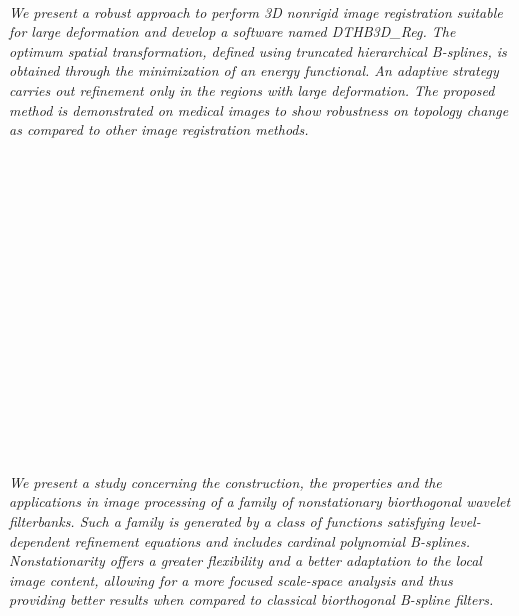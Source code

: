 \begin{multicols}{2}
\\
      \textit{We present a robust approach to perform 3D nonrigid image registration suitable for large deformation and develop a software named DTHB3D\_Reg. The optimum spatial transformation, defined using truncated hierarchical B-splines, is obtained through the minimization of an energy functional. An adaptive strategy carries out refinement only in the regions with large deformation. The proposed method is demonstrated on medical images to show robustness on topology change as compared to other image registration methods.}\\
\\ 
        \\
        \\\\
        \\
        \\\\
        \\
        \\\\
        \\
        \\\\
        \\
        \\\\
\\
      \textit{We present a study concerning the construction, the properties and the applications in image processing of a family of nonstationary biorthogonal wavelet filterbanks. Such a family is generated by a class of functions satisfying level-dependent refinement equations and includes cardinal polynomial B-splines. Nonstationarity offers a greater flexibility and a better adaptation to the local image content, allowing for a more focused scale-space analysis and thus providing better results when compared to classical biorthogonal B-spline filters.}\\
\\ 
        \\
        \\\\
        \\

\end{multicols}
